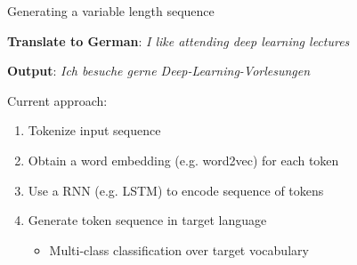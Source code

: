 \documentclass[12pt,aspectratio=169,handout]{beamer}
\begin{document}
\begin{frame}{Generating a variable length sequence}

	\textbf{Translate to German}: \textit{I like attending deep learning lectures}

	\pause

	\textbf{Output}: \textit{Ich besuche gerne Deep-Learning-Vorlesungen}

	\pause

	Current approach:
	\begin{enumerate}
		\item Tokenize input sequence
		\item Obtain a word embedding (e.g. word2vec) for each token
		\item Use a RNN (e.g. LSTM) to encode sequence of tokens
		\item Generate token sequence in target language
		\pause
		\begin{itemize}
			\item Multi-class classification over target vocabulary
		\end{itemize}
	\end{enumerate}

\end{frame}
\end{document}
